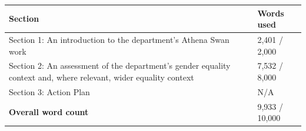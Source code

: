 \begin{titlepage}
    \begin{table}[!h]
      \begin{tabular}{|P{6.2cm}|P{9.3cm}|}
          \hline
          \textbf{Section} & \textbf{Words used} \\
          \hline
          Section 1: An introduction to the department's Athena Swan work & 2,401   / 2,000\\ 
          \hline
          Section 2: An assessment of the department's gender equality context and, where relevant, wider equality context & 7,532 / 8,000\\
          \hline
          Section 3: Action Plan & N/A\\
          \hline
          \textbf{Overall word count} & 9,933 / 10,000\\
          \hline
      \end{tabular}
      \label{tab:frontinfo2}
    \end{table}

\end{titlepage}


\restoregeometry 
\pagecolor{white}



